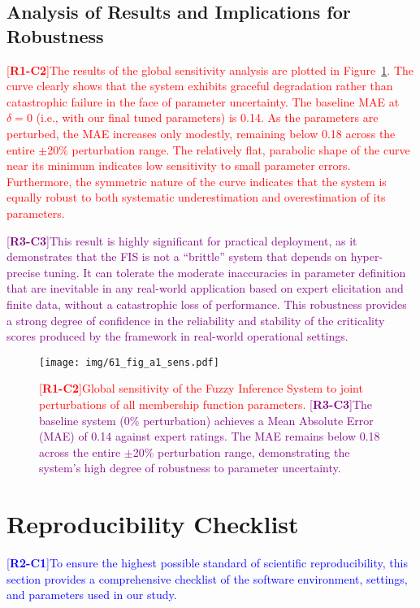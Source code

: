 \documentclass[energies,supfile,submit,pdftex,moreauthors]{Definitions/mdpi}
\newcommand{\revtag}[2]{[\textbf{R#1-C#2}]}
\newcommand{\Rone}[1]{\textcolor{red}{#1}}
\newcommand{\Rtwo}[1]{\textcolor{blue}{#1}}
\newcommand{\Rthree}[1]{\textcolor{purple}{#1}}
\begin{document}
\subsection{Analysis of Results and Implications for Robustness}
\Rone{\revtag{1}{2}The results of the global sensitivity analysis are plotted in Figure~\ref{fig:sensplot}. The curve clearly shows that the system exhibits graceful degradation rather than catastrophic failure in the face of parameter uncertainty. The baseline MAE at \(\delta=0\) (i.e., with our final tuned parameters) is 0.14. As the parameters are perturbed, the MAE increases only modestly, remaining below 0.18 across the entire \(\pm\)20\% perturbation range. The relatively flat, parabolic shape of the curve near its minimum indicates low sensitivity to small parameter errors. Furthermore, the symmetric nature of the curve indicates that the system is equally robust to both systematic underestimation and overestimation of its parameters.}

\Rthree{\revtag{3}{3}This result is highly significant for practical deployment, as it demonstrates that the FIS is not a ``brittle'' system that depends on hyper-precise tuning. It can tolerate the moderate inaccuracies in parameter definition that are inevitable in any real-world application based on expert elicitation and finite data, without a catastrophic loss of performance. This robustness provides a strong degree of confidence in the reliability and stability of the criticality scores produced by the framework in real-world operational settings.}

\begin{figure}[!htb]
    \centering
    \texttt{[image: img/61\_fig\_a1\_sens.pdf]}
    \caption{\Rone{\revtag{1}{2}Global sensitivity of the Fuzzy Inference System to joint perturbations of all membership function parameters.} \Rthree{\revtag{3}{3}The baseline system (0\% perturbation) achieves a Mean Absolute Error (MAE) of 0.14 against expert ratings. The MAE remains below 0.18 across the entire \(\pm\)20\% perturbation range, demonstrating the system's high degree of robustness to parameter uncertainty.}}
    \label{fig:sensplot}
\end{figure}

\section{Reproducibility Checklist}\label{sec:reproducibility}
\Rtwo{\revtag{2}{1}To ensure the highest possible standard of scientific reproducibility, this section provides a comprehensive checklist of the software environment, settings, and parameters used in our study.}
\end{document}

